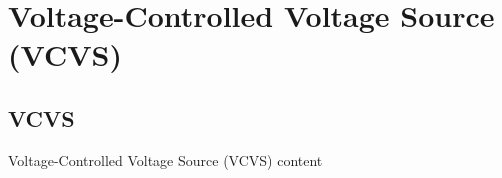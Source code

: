 \section{Voltage-Controlled Voltage Source (VCVS)}

\subsection{VCVS}
\begin{frame}{Voltage-Controlled Voltage Source (VCVS)}
	content
\end{frame}